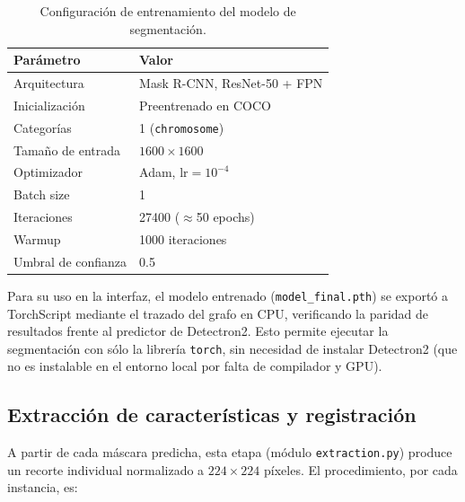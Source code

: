 \documentclass[11pt,a4paper]{article}
\begin{document}
\begin{table}[H]
  \centering
  \small
  \caption{Configuración de entrenamiento del modelo de segmentación.}
  \label{tab:seg-config}
  \begin{tabular}{ll}
    \toprule
    Parámetro & Valor \\
    \midrule
    Arquitectura        & Mask R-CNN, ResNet-50 + FPN \\
    Inicialización      & Preentrenado en COCO \\
    Categorías          & 1 (\texttt{chromosome}) \\
    Tamaño de entrada   & \(1600 \times 1600\) \\
    Optimizador         & Adam, \(\text{lr}=10^{-4}\) \\
    Batch size          & 1 \\
    Iteraciones         & 27400 (\(\approx\)50 epochs) \\
    Warmup              & 1000 iteraciones \\
    Umbral de confianza & 0.5 \\
    \bottomrule
  \end{tabular}
\end{table}

Para su uso en la interfaz, el modelo entrenado (\texttt{model\_final.pth}) se
exportó a TorchScript mediante el trazado del grafo en CPU, verificando la
paridad de resultados frente al predictor de Detectron2. Esto permite ejecutar la
segmentación con sólo la librería \texttt{torch}, sin necesidad de instalar
Detectron2 (que no es instalable en el entorno local por falta de compilador y GPU).

\subsection{Extracción de características y registración}
\label{sec:extraccion}

A partir de cada máscara predicha, esta etapa (módulo \texttt{extraction.py})
produce un recorte individual normalizado a \(224\times224\) píxeles. El
procedimiento, por cada instancia, es:
\end{document}
